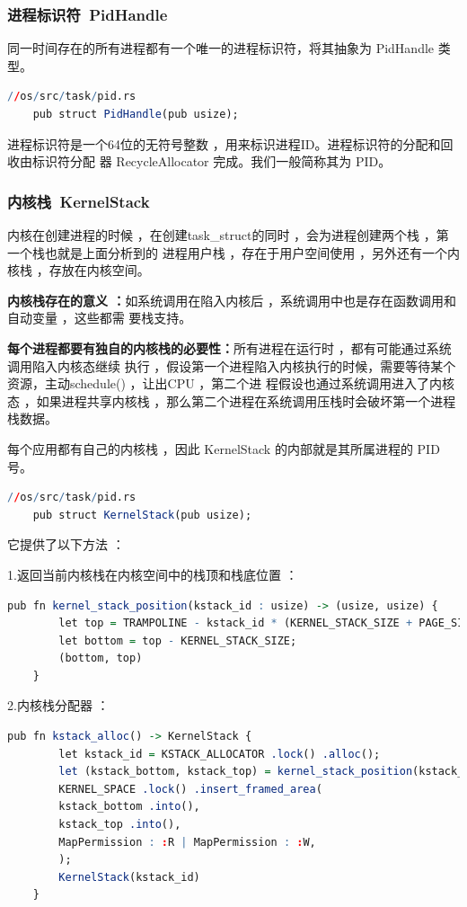 \subsubsection{进程标识符\ PidHandle}
同一时间存在的所有进程都有一个唯一的进程标识符，将其抽象为 PidHandle 类型。
\begin{lstlisting}[language=R]
	//os/src/task/pid.rs
	pub struct PidHandle(pub usize);
\end{lstlisting}

进程标识符是一个64位的无符号整数 ，用来标识进程ID。进程标识符的分配和回收由标识符分配 器 RecycleAllocator 完成。我们一般简称其为 PID。

\subsubsection{内核栈\ KernelStack}
内核在创建进程的时候 ，在创建task\_struct的同时 ，会为进程创建两个栈 ，第一个栈也就是上面分析到的 进程用户栈 ，存在于用户空间使用 ，另外还有一个内核栈 ，存放在内核空间。

\textbf{内核栈存在的意义 ：}如系统调用在陷入内核后 ，系统调用中也是存在函数调用和自动变量 ，这些都需 要栈支持。

\textbf{每个进程都要有独自的内核栈的必要性：}所有进程在运行时 ，都有可能通过系统调用陷入内核态继续 执行 ，假设第一个进程陷入内核执行的时候，需要等待某个资源，主动schedule() ，让出CPU ，第二个进 程假设也通过系统调用进入了内核态 ，如果进程共享内核栈 ，那么第二个进程在系统调用压栈时会破坏第一个进程栈数据。

每个应用都有自己的内核栈 ，因此 KernelStack 的内部就是其所属进程的 PID 号。

\begin{lstlisting}[language=R]
	//os/src/task/pid.rs
	pub struct KernelStack(pub usize);
\end{lstlisting}

它提供了以下方法 ：

1.返回当前内核栈在内核空间中的栈顶和栈底位置 ：
\begin{lstlisting}[language=R]
	pub fn kernel_stack_position(kstack_id : usize) -> (usize, usize) {
		let top = TRAMPOLINE - kstack_id * (KERNEL_STACK_SIZE + PAGE_SIZE);
		let bottom = top - KERNEL_STACK_SIZE;
		(bottom, top)
	}
\end{lstlisting}

2.内核栈分配器 ：
\begin{lstlisting}[language=R]
	pub fn kstack_alloc() -> KernelStack {
		let kstack_id = KSTACK_ALLOCATOR .lock() .alloc();
		let (kstack_bottom, kstack_top) = kernel_stack_position(kstack_id);
		KERNEL_SPACE .lock() .insert_framed_area(
		kstack_bottom .into(),
		kstack_top .into(),
		MapPermission : :R | MapPermission : :W,
		);
		KernelStack(kstack_id)
	}
\end{lstlisting}

